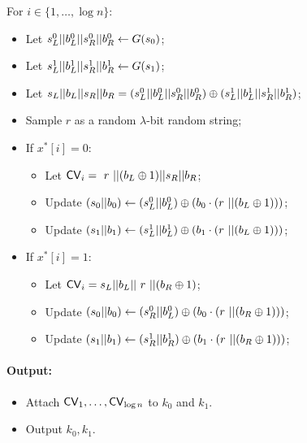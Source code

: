 \begin{figure}
\begin{minipage}{\textwidth}
\begin{mdframed}
            
            For $i\in \{1,\dots, \log n\}$: 
            \begin{itemize}
                \item Let $s^0_L || b^0_L || s^0_R || b^0_R\leftarrow G(s_0)$;
                \item Let $s^1_L || b^1_L || s^1_R || b^1_R\leftarrow G(s_1)$;
                \item Let $s_L || b_L || s_R || b_R=(s^0_L || b^0_L || s^0_R || b^0_R) \oplus (s^1_L || b^1_L || s^1_R || b^1_R)$;
                \item Sample $r$ as a random $\lambda$-bit random string;
                \item If $x^*[i]=0$: 
                \begin{itemize}
                    \item Let ${\sf CV}_i =~ r ~|| (b_L \oplus 1) || s_R || b_R$; \hfill 
                    \item Update $(s_0 || b_0) \leftarrow (s^0_L || b^0_L) \oplus (b_0 \cdot (r ~|| (b_L \oplus 1)))$;
                    \item Update $(s_1 || b_1) \leftarrow (s^1_L || b^1_L) \oplus (b_1 \cdot (r ~|| (b_L \oplus 1)))$;
                \end{itemize}
                \item If $x^*[i]=1$: 
                \begin{itemize}
                    \item Let ${\sf CV}_i = s_L || b_L || ~r ~|| (b_R \oplus 1)$;\hfill %
                    \item Update $(s_0 || b_0) \leftarrow (s^0_R || b^0_L) \oplus (b_0 \cdot (r ~|| (b_R \oplus 1)))$;
                    \item Update $(s_1 || b_1) \leftarrow (s^1_R || b^1_R) \oplus (b_1 \cdot (r ~|| (b_R \oplus 1)))$;
                \end{itemize}
            \end{itemize}
            
            \paragraph{Output:}
            \begin{itemize}
                \item Attach ${\sf CV}_1,\dots,{\sf CV}_{\log n}$ to $k_0$ and $k_1$.
                \item Output $k_0,k_1$.
            \end{itemize}
            

\end{mdframed}
\end{minipage}
\end{figure}
